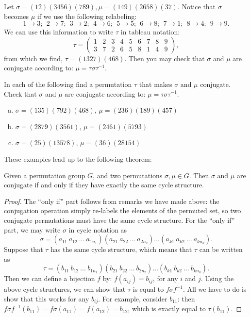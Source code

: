 \begin{example}\label{example:actions:Coj4}
Let $\sigma = (12)(3456)(789), \mu = (149)(2658)(37)$.  Notice that $\sigma$ becomes $\mu$ if we use the following relabeling:
$$ 1 \rightarrow 3;~~2 \rightarrow 7;~~3\rightarrow 2;~~4\rightarrow 6;~~5\rightarrow 5;~~6\rightarrow 8;~~7\rightarrow 1;~~8\rightarrow 4;~~9\rightarrow 9.$$
We can use this information to write $\tau$ in tableau notation:
$$ \tau =\begin{pmatrix} 1&2&3&4&5&6&7&8&9 \\ 3&7&2&6&5&8&1&4&9 \end{pmatrix}, $$
from which we find, $\tau=(1327)(468)$.  Then you may check that $\sigma$ and $\mu$ are conjugate according to: $\mu = \tau \sigma \tau^{-1}$.
\end{example}
\begin{exercise}\label{exercise:actions:Conj5}
In each of the following find a permutation $\tau$ that makes $\sigma$ and $\mu$ conjugate.  Check that $\sigma$ and $\mu$ are conjugate according to: $\mu = \tau \sigma \tau^{-1}$.

\begin{enumerate}[(a)]
\item $\sigma=(135)(792)(468)$, $\mu=(236)(189)(457)$
\item $\sigma=(2879)(3561)$, $\mu=(2461)(5793)$
\item $\sigma=(25)(13578)$, $\mu=(36)(28154)$
\end{enumerate}
\end{exercise}
These examples lead up to the following theorem:

\begin{prop}\label{proposition:actions:ConjPerm} Given a permutation group $G$, and two permutations $\sigma, \mu \in G$.  Then $\sigma$ and $\mu$ are conjugate if and only if they have exactly the same cycle structure.
\end{prop}
\begin{proof}
The ``only if'' part follows from remarks we have made above: the conjugation operation simply re-labels the elements of the permuted set, so two conjugate permutations must have the same cycle structure.
For the ``only if'' part, we may write $\sigma$ in cycle notation as
$$\sigma = (a_{11}~a_{12}~\ldots~a_{1n_1})(a_{21}~a_{22}~\ldots~a_{2n_2})  \ldots(a_{k1}~a_{k2}~\ldots~a_{k n_k}).$$  
Suppose that $\tau$ has the same cycle structure, which means that $\tau$ can be written as
$$\tau = (b_{11}~b_{12}~\ldots~b_{1n_1})(b_{21}~b_{22}~\ldots~b_{2n_2})  \ldots(b_{k1}~b_{k2}~\ldots~b_{k n_k}).$$
Then we can define a bijection $f$ by: $f(a_{ij}) = b_{ij}$, for any $i$ and $j$. Using the above cycle structures, we can show that $\tau$ is equal to $f \sigma f^{-1}$.  All we have to do is show that this works for any $ b_{ij}$.  For example, consider $b_{11}$: then $f \sigma f^{-1}( b_{11}) = f \sigma ( a_{11}) = f ( a_{12})= b_{12}$, which is exactly equal to $ \tau(b_{11})$.
\end{proof}

